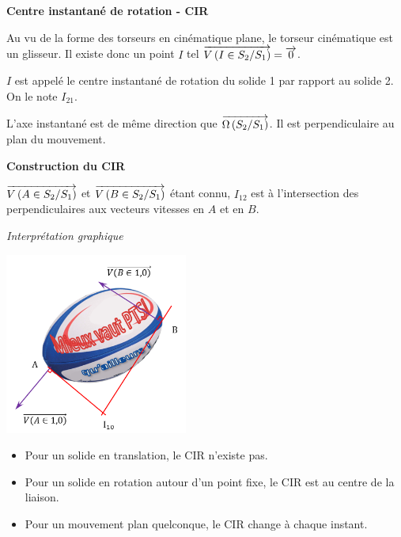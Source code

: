 \documentclass[10pt]{article}
\begin{document}
\begin{resultat}
\textbf{Centre instantané de rotation - CIR}

Au vu de la forme des torseurs en cinématique plane, le torseur cinématique est un glisseur. Il existe donc un point $I$ tel $\overrightarrow{V\left( {I} \in {S_2}/{S_1}\right)}= \overrightarrow{0}$. 

$I$ est appelé le centre instantané de rotation du solide 1 par rapport au solide 2. On le note $I_{21}$.

L'axe instantané est de même direction que $\overrightarrow{\Omega\left( {S_2}/{S_1}\right)}$. Il est perpendiculaire au plan du mouvement.

\end{resultat}

\begin{resultat}
\textbf{Construction du CIR}

$\overrightarrow{V\left( {A} \in {S_2}/{S_1}\right)}$ et $\overrightarrow{V\left( {B} \in {S_2}/{S_1}\right)}$ étant connu, $I_{12}$ est à l'intersection des perpendiculaires aux vecteurs vitesses en $A$ et en $B$.

\end{resultat}

\begin{exemple}
\textit{Interprétation graphique}

\begin{center}
\includegraphics[width=6cm]{images/ballon2}
\end{center}
\end{exemple}



\begin{rem}
\begin{itemize}
\item Pour un solide en translation, le CIR n'existe pas.
\item Pour un solide en rotation autour d'un point fixe, le CIR est au centre de la liaison.
\item Pour un mouvement plan quelconque, le CIR change à chaque instant.
\end{itemize}
\end{rem}
\end{document}
